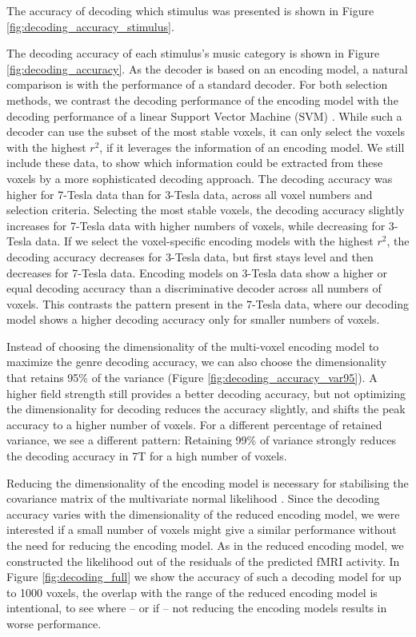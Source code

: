 The accuracy of decoding which stimulus was presented
is shown in Figure \ref{fig:decoding_accuracy_stimulus}. %

The decoding accuracy of each stimulus's music category is shown in Figure
\ref{fig:decoding_accuracy}. As the decoder is based on an encoding model, a
natural comparison is with the performance of a standard decoder. For both
selection methods, we contrast the decoding performance of the encoding model
with the decoding performance of a linear Support Vector Machine (SVM)
\citep{FCH+08,V13}. While such a decoder can use the subset of the most stable
voxels, it can only select the voxels with the highest $r^2$, if it leverages
the information of an encoding model. We still include these data, to show
which information could be extracted from these voxels by a more sophisticated
decoding approach.  The decoding accuracy was higher for 7-Tesla data  than for
3-Tesla data, across all voxel numbers and selection criteria.  Selecting the
most stable voxels, the decoding accuracy slightly increases for 7-Tesla data
with higher numbers of voxels, while decreasing for 3-Tesla data.  If we select
the voxel-specific encoding models with the highest $r^2$, the decoding
accuracy decreases for 3-Tesla data, but first stays level and then decreases
for 7-Tesla data. Encoding models on 3-Tesla data show a higher or equal
decoding accuracy than a discriminative decoder across all numbers of voxels.
This contrasts the pattern present in the 7-Tesla data, where our decoding
model shows a higher decoding accuracy only for smaller numbers of voxels.

Instead of choosing the dimensionality of the multi-voxel encoding model to
maximize the genre decoding accuracy, we can also choose the dimensionality that retains
95\% of the variance (Figure \ref{fig:decoding_accuracy_var95}). A higher field
strength still provides a better decoding accuracy, but not optimizing the
dimensionality for decoding reduces the accuracy slightly, and shifts the peak
accuracy to a higher number of voxels. For a different percentage of retained
variance, we see a different pattern: Retaining 99\% of variance strongly
reduces the decoding accuracy in 7T for a high number of voxels. 

Reducing the dimensionality of the encoding model is necessary for stabilising
the covariance matrix of the multivariate normal likelihood \citet{NG11}.  
Since the decoding accuracy varies with the dimensionality of the reduced
encoding model, we were interested if a small number of voxels might give a
similar performance without the need for reducing the encoding model. As in the
reduced encoding model, we constructed the likelihood out of the residuals of
the predicted f{MRI} activity. In Figure \ref{fig:decoding_full} we show the
accuracy of such a decoding model for up to 1000 voxels, the overlap with the
range of the reduced encoding model is intentional, to see where -- or if -- not
reducing the encoding models results in worse performance.

